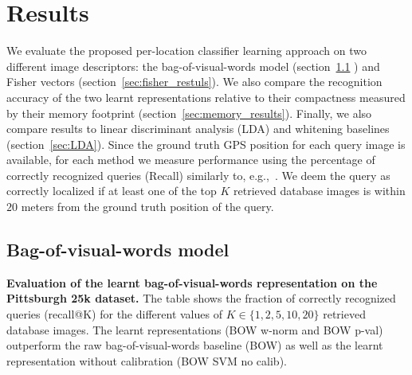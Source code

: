 \section{Results}
\label{sec:results}
  We evaluate the proposed per-location classifier learning approach on two different image descriptors: the bag-of-visual-words model (section~\ref{sec:bow_results} ) and Fisher vectors (section~\ref{sec:fisher_restuls}).  We also compare the recognition accuracy of the two learnt representations relative to their compactness measured by their memory footprint (section~\ref{sec:memory_results}).
 \textcolor{petr}{Finally, we also compare results to linear discriminant analysis (LDA) and whitening baselines (section~\ref{sec:LDA}).} 
  Since the ground truth GPS position for each query image is available, for each method we measure performance using the percentage of correctly recognized queries (Recall) similarly to, e.g.,~\cite{Chen11,Knopp2010,Sattler-BMVC12}. We deem the query as correctly localized if at least one of the top $K$ retrieved database images is within $20$ meters from the ground truth position of the query. 


  \subsection{Bag-of-visual-words model}
  \label{sec:bow_results}
  
    \begin{table}[tbp]
      \begin{centering}
        
        \caption{ 
          \textbf{Evaluation of the learnt bag-of-visual-words representation on the Pittsburgh 25k dataset.}
          The table shows the fraction of correctly recognized queries (recall@K) for the different values of $K\in\{1,2,5,10,20\}$ retrieved database images. 
          The learnt representations (BOW w-norm and BOW p-val) outperform the raw bag-of-visual-words baseline (BOW) as well as the learnt representation without calibration (BOW SVM no calib).  
        }
        \label{tab:recallBOW}
      \end{centering}
    \end{table}

